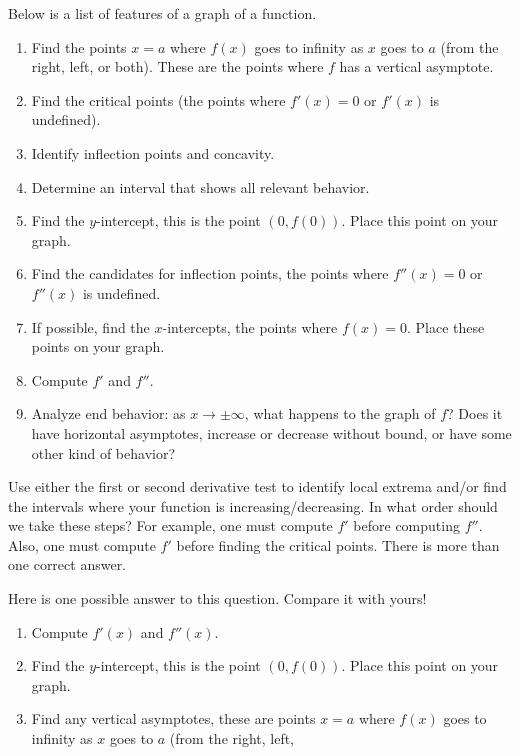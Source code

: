 \documentclass{ximera}
\begin{document}
\begin{problem}%
  Below is a list of features of a graph of a function.
  \begin{enumerate}
  \item Find the points $x=a$ where
    $f(x)$ goes to infinity as $x$ goes to $a$ (from the right, left,
    or both). These are the points where $f$ has a  vertical asymptote.
  \item Find the critical points (the points where $f'(x) = 0$ or
    $f'(x)$ is undefined).
 
  \item Identify inflection points and concavity.
  \item Determine an interval that shows all relevant behavior.
  \item Find the $y$-intercept, this is the point $(0,f(0))$. Place this
    point on your graph.
      \item Find the candidates for inflection points, the points where
    $f''(x) = 0$ or $f''(x)$ is undefined.
  \item If possible, find the $x$-intercepts, the points where $f(x) =
    0$. Place these points on your graph.
       \item Compute $f'$ and $f''$.
  \item Analyze end behavior:  as $x \to \pm \infty$, what happens to the graph of $f$?  Does it  have horizontal asymptotes, increase or decrease without bound, or have some other kind of behavior?
 \end{enumerate}
   \item Use either the first or second derivative test to identify local extrema and/or
    find the intervals where your function is increasing/decreasing.
  In what order should we take these steps? For example, one must compute
   $f'$ before computing $f''$. Also, one must compute $f'$ before 
   finding the critical points. There is more than one correct answer.
  \begin{freeResponse}
  Here is one possible answer to this question.  Compare it with yours!
  \begin{enumerate}
  \item Compute $f'(x)$ and $f''(x)$.
  \item Find the $y$-intercept, this is the point $(0,f(0))$. Place this
    point on your graph.
  \item Find any vertical asymptotes, these are points $x=a$ where
    $f(x)$ goes to infinity as $x$ goes to $a$ (from the right, left,

\end{enumerate}
\end{freeResponse}
\end{problem}
\end{document}
